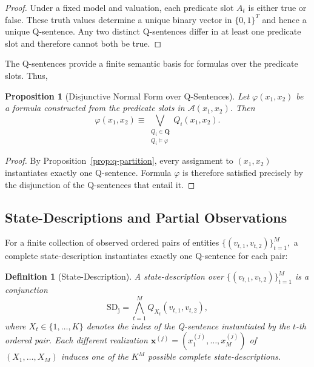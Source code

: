 \documentclass[10pt, conference, letterpaper]{ IEEEtran}
\theoremstyle{bfnote}
\newtheorem{definition}{Definition}
\newtheorem{proposition}{Proposition}
\newcommand{\QSent}{\mathbf{Q}} %
\begin{document}
\begin{proof}
Under a fixed model and valuation, each predicate slot $A_t$ is either true
or false. These truth values determine a unique binary vector in
$\{0,1\}^{T}$ and hence a unique Q-sentence. Any two distinct Q-sentences
differ in at least one predicate slot and therefore cannot both be true.
\end{proof}

The Q-sentences provide a finite semantic basis for formulas over the
predicate slots. Thus,

\begin{proposition}[Disjunctive Normal Form over Q-Sentences]
\label{dnfinfol}
Let $\varphi(x_1,x_2)$ be a formula constructed from the predicate slots in
$\mathcal{A}(x_1,x_2)$. Then
\begin{equation}
\label{eq:q-dnf}
\varphi(x_1,x_2)
\equiv
\bigvee_{\substack{
Q_i\in\QSent\\
Q_i\models\varphi
}}
Q_i(x_1,x_2).
\end{equation}
\end{proposition}

\begin{proof}
By Proposition~\ref{prop:q-partition}, every assignment to
$(x_1,x_2)$ instantiates exactly one Q-sentence. Formula $\varphi$ is therefore
satisfied precisely by the disjunction of the Q-sentences that entail it.
\end{proof}


\subsection{State-Descriptions and Partial Observations}

For a finite collection of observed ordered pairs of entities
$
    \{(v_{t,1},v_{t,2})\}_{t=1}^{M},
$
a complete state-description instantiates exactly one Q-sentence for each pair:

\begin{definition}[State-Description]
\label{def:state-description}
A state-description over $ \{(v_{t,1},v_{t,2})\}_{t=1}^{M}$ is a conjunction
\begin{equation}
\label{eq:state-description}
    \mathrm{SD_j}
    =
    \bigwedge_{t=1}^{M}
    Q_{X_t}(v_{t,1},v_{t,2}),
\end{equation}
where $X_t\in\{1,\ldots,K\}$ denotes the index of the Q-sentence instantiated
by the $t$-th ordered pair. Each different realization
$\boldsymbol{x}^{(j)}=(x_1^{(j)},\ldots,x_M^{(j)})$ of
$(X_1,\ldots,X_M)$ induces one of the $K^M$ possible complete
state-descriptions.
\end{definition}
\end{document}
